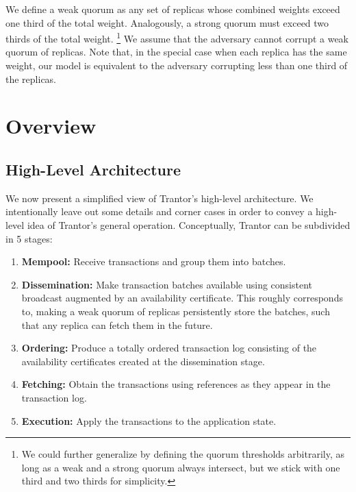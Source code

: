 \documentclass{article}
\begin{document}
We define a weak quorum as any set of replicas whose combined weights exceed one third of the total weight.
Analogously, a strong quorum must exceed two thirds of the total weight.%
\footnote{We could further generalize by defining the quorum thresholds arbitrarily,
as long as a weak and a strong quorum always intersect, but we stick with one third and two thirds for simplicity.}
We assume that the adversary cannot corrupt a weak quorum of replicas.
Note that, in the special case when each replica has the same weight,
our model is equivalent to the adversary corrupting less than one third of the replicas.

\section{Overview}
\label{sec:overview}

\subsection{High-Level Architecture}

We now present a simplified view of Trantor’s high-level architecture.
We intentionally leave out some details and corner cases in order to convey a high-level idea of Trantor’s general operation.
Conceptually, Trantor can be subdivided in 5 stages:

\begin{enumerate}

    \item \textbf{Mempool:} Receive transactions and group them into batches.

    \item \textbf{Dissemination:} Make transaction batches available using consistent broadcast \cite{distributedprogrammingbook} augmented by an availability certificate.
    This roughly corresponds to, making a weak quorum of replicas persistently store the batches, such that any replica can fetch them in the future.

    \item \textbf{Ordering:} Produce a totally ordered transaction log consisting of the availability certificates created at the dissemination stage.

    \item \textbf{Fetching:} Obtain the transactions using references as they appear in the transaction log.

    \item \textbf{Execution:} Apply the transactions to the application state.

\end{enumerate}
\end{document}
